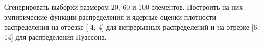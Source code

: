 \item Сгенерировать выборки размером 20, 60 и 100 элементов. \newline Построить на них эмпирические функции распределения и ядерные оценки плотности распределения на отрезке [-4; 4] для непрерывных распределений и на отрезке [6; 14] для распределения Пуассона.